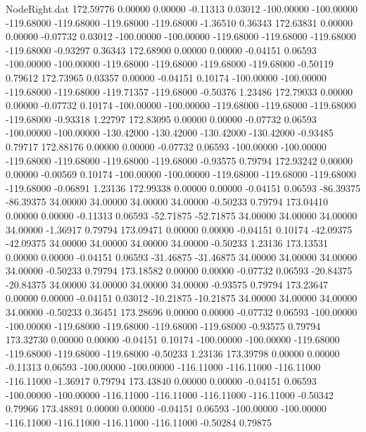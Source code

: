 \begin{filecontents}{NodeRight.dat}
 172.59776    0.00000    0.00000    -0.11313    0.03012 -100.00000 -100.00000 -119.68000 -119.68000 -119.68000 -119.68000   -1.36510    0.36343
 172.63831    0.00000    0.00000    -0.07732    0.03012 -100.00000 -100.00000 -119.68000 -119.68000 -119.68000 -119.68000   -0.93297    0.36343
 172.68900    0.00000    0.00000    -0.04151    0.06593 -100.00000 -100.00000 -119.68000 -119.68000 -119.68000 -119.68000   -0.50119    0.79612
 172.73965    0.03357    0.00000    -0.04151    0.10174 -100.00000 -100.00000 -119.68000 -119.68000 -119.71357 -119.68000   -0.50376    1.23486
 172.79033    0.00000    0.00000    -0.07732    0.10174 -100.00000 -100.00000 -119.68000 -119.68000 -119.68000 -119.68000   -0.93318    1.22797
 172.83095    0.00000    0.00000    -0.07732    0.06593 -100.00000 -100.00000 -130.42000 -130.42000 -130.42000 -130.42000   -0.93485    0.79717
 172.88176    0.00000    0.00000    -0.07732    0.06593 -100.00000 -100.00000 -119.68000 -119.68000 -119.68000 -119.68000   -0.93575    0.79794
 172.93242    0.00000    0.00000    -0.00569    0.10174 -100.00000 -100.00000 -119.68000 -119.68000 -119.68000 -119.68000   -0.06891    1.23136
 172.99338    0.00000    0.00000    -0.04151    0.06593  -86.39375  -86.39375   34.00000   34.00000   34.00000   34.00000   -0.50233    0.79794
 173.04410    0.00000    0.00000    -0.11313    0.06593  -52.71875  -52.71875   34.00000   34.00000   34.00000   34.00000   -1.36917    0.79794
 173.09471    0.00000    0.00000    -0.04151    0.10174  -42.09375  -42.09375   34.00000   34.00000   34.00000   34.00000   -0.50233    1.23136
 173.13531    0.00000    0.00000    -0.04151    0.06593  -31.46875  -31.46875   34.00000   34.00000   34.00000   34.00000   -0.50233    0.79794
 173.18582    0.00000    0.00000    -0.07732    0.06593  -20.84375  -20.84375   34.00000   34.00000   34.00000   34.00000   -0.93575    0.79794
 173.23647    0.00000    0.00000    -0.04151    0.03012  -10.21875  -10.21875   34.00000   34.00000   34.00000   34.00000   -0.50233    0.36451
 173.28696    0.00000    0.00000    -0.07732    0.06593 -100.00000 -100.00000 -119.68000 -119.68000 -119.68000 -119.68000   -0.93575    0.79794
 173.32730    0.00000    0.00000    -0.04151    0.10174 -100.00000 -100.00000 -119.68000 -119.68000 -119.68000 -119.68000   -0.50233    1.23136
 173.39798    0.00000    0.00000    -0.11313    0.06593 -100.00000 -100.00000 -116.11000 -116.11000 -116.11000 -116.11000   -1.36917    0.79794
 173.43840    0.00000    0.00000    -0.04151    0.06593 -100.00000 -100.00000 -116.11000 -116.11000 -116.11000 -116.11000   -0.50342    0.79966
 173.48891    0.00000    0.00000    -0.04151    0.06593 -100.00000 -100.00000 -116.11000 -116.11000 -116.11000 -116.11000   -0.50284    0.79875

\end{filecontents}

